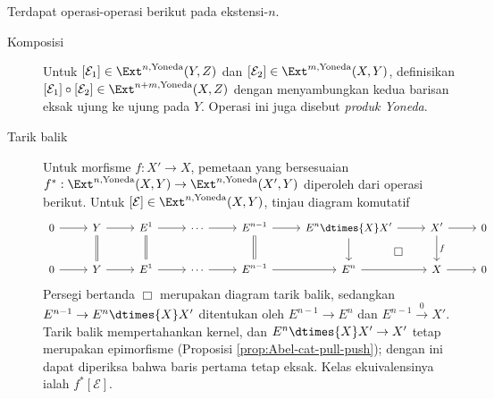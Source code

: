 Terdapat operasi-operasi berikut pada ekstensi-$n$.

\begin{description}
	\item[Komposisi] Untuk
	$[\mathcal{E}_1] \in \Ext^{n, \text{Yoneda}}(Y, Z)$ dan
	$[\mathcal{E}_2] \in \Ext^{m, \text{Yoneda}}(X, Y)$, definisikan
	$[\mathcal{E}_1] \circ [\mathcal{E}_2] \in
	\Ext^{n+m, \text{Yoneda}}(X, Z)$ dengan menyambungkan kedua barisan eksak
	ujung ke ujung pada $Y$. Operasi ini juga disebut \emph{produk Yoneda}.
	\item[Tarik balik] Untuk morfisme $f: X' \to X$, pemetaan yang bersesuaian
	$f^*: \Ext^{n, \text{Yoneda}}(X, Y) \to
	\Ext^{n, \text{Yoneda}}(X', Y)$ diperoleh dari operasi berikut. Untuk
	$[\mathcal{E}] \in \Ext^{n, \text{Yoneda}}(X, Y)$, tinjau diagram
	komutatif
	\[\begin{tikzcd}[every cell/.append style={font=\small}]
		0 \arrow[r] & Y \arrow[r] \arrow[equal, d] & E^1 \arrow[r] \arrow[equal, d] & \cdots \arrow[r] & E^{n-1}  \arrow[equal, d] \arrow[r] & E^n \dtimes{X} X' \arrow[d] \arrow[r] \arrow[phantom, rd, "\Box" description] & X' \arrow[d, "f"] \arrow[r] & 0 \\
		0 \arrow[r] & Y \arrow[r] & E^1 \arrow[r] & \cdots \arrow[r] & E^{n-1} \arrow[r] & E^n \arrow[r] & X \arrow[r] & 0
	\end{tikzcd}\]
	Persegi bertanda $\Box$ merupakan diagram tarik balik, sedangkan
	$E^{n-1} \to E^n \dtimes{X} X'$ ditentukan oleh $E^{n-1} \to E^n$ dan
	$E^{n-1} \xrightarrow{0} X'$. Tarik balik mempertahankan kernel, dan
	$E^n \dtimes{X} X' \to X'$ tetap merupakan epimorfisme (Proposisi
	\ref{prop:Abel-cat-pull-push}); dengan ini dapat diperiksa bahwa baris pertama
	tetap eksak. Kelas ekuivalensinya ialah $f^* [\mathcal{E}]$.
	

\end{description}
